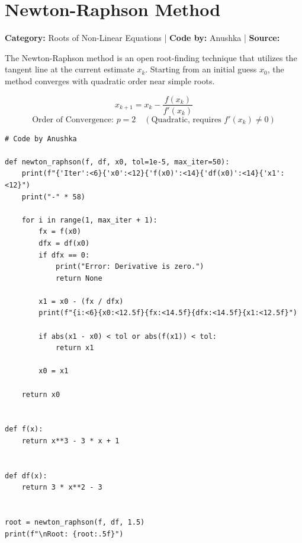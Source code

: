 \documentclass[10pt,a4paper]{report}
\begin{document}
\newpage

\section{Newton-Raphson Method}
\textbf{Category:} \textcolor{secondary}{Roots of Non-Linear Equations} \quad | \quad \textbf{Code by:} \textcolor{secondary}{Anushka} \quad | \quad \textbf{Source:} \texttt{}

The Newton-Raphson method is an open root-finding technique that utilizes the tangent line at the current estimate $x_k$. Starting from an initial guess $x_0$, the method converges with quadratic order near simple roots.

\begin{tcolorbox}[colback=theorybg,colframe=theoryframe,title=\textbf{Mathematical Theory \& Formulation},boxrule=1pt,arc=2mm]
\[
x_{k+1} = x_k - \frac{f(x_k)}{f'(x_k)}
\]
\[
\text{Order of Convergence: } p = 2 \quad (\text{Quadratic, requires } f'(x_k) \neq 0)
\]
\end{tcolorbox}

\begin{tcolorbox}[colback=codebg,colframe=secondary,title=\textbf{Python Implementation (Step-by-Step Loops \& Pure Functions)},boxrule=1pt,arc=2mm]
\begin{lstlisting}[style=python_detailed]
# Code by Anushka

def newton_raphson(f, df, x0, tol=1e-5, max_iter=50):
    print(f"{'Iter':<6}{'x0':<12}{'f(x0)':<14}{'df(x0)':<14}{'x1':<12}")
    print("-" * 58)

    for i in range(1, max_iter + 1):
        fx = f(x0)
        dfx = df(x0)
        if dfx == 0:
            print("Error: Derivative is zero.")
            return None

        x1 = x0 - (fx / dfx)
        print(f"{i:<6}{x0:<12.5f}{fx:<14.5f}{dfx:<14.5f}{x1:<12.5f}")

        if abs(x1 - x0) < tol or abs(f(x1)) < tol:
            return x1

        x0 = x1

    return x0


def f(x):
    return x**3 - 3 * x + 1


def df(x):
    return 3 * x**2 - 3


root = newton_raphson(f, df, 1.5)
print(f"\nRoot: {root:.5f}")

\end{lstlisting}
\end{tcolorbox}
\end{document}
